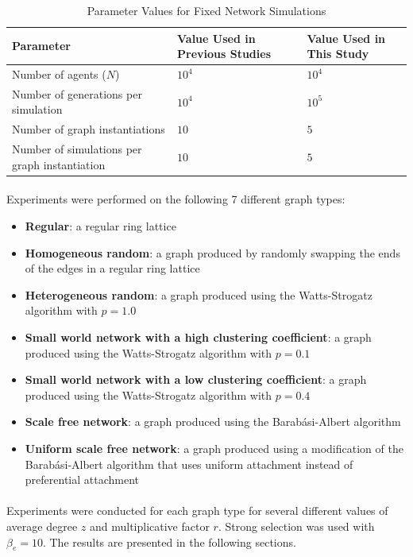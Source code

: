 \documentclass{article}
\begin{document}
	\begin{table}[h!]
		\begin{center}
		\begin{tabu} to \textwidth {X[0.66,l,m]X[0.17,c,m]X[0.17,c,m]}
		\toprule
		Parameter&Value Used in Previous Studies&Value Used in This Study\\
		\midrule
		Number of agents ($N$)&$10^4$&$10^4$\\
		Number of generations per simulation&$10^4$&$10^5$\\
		Number of graph instantiations&$10$&$5$\\
		Number of simulations per graph instantiation&$10$&$5$\\
		\bottomrule
		\end{tabu}
		\caption{Parameter Values for Fixed Network Simulations}
		\label{table:param-values-fixed-net-sim}
		\end{center}
	\end{table}

	\paragraph{}Experiments were performed on the following 7 different graph types:
	\begin{itemize}
		\item \textbf{Regular}: a regular ring lattice
		\item \textbf{Homogeneous random}: a graph produced by randomly swapping the ends of the edges in a regular ring lattice
		\item \textbf{Heterogeneous random}: a graph produced using the Watts-Strogatz algorithm \cite{Watts1998} with $p = 1.0$
		\item \textbf{Small world network with a high clustering coefficient}: a graph produced using the Watts-Strogatz algorithm with $p = 0.1$
		\item \textbf{Small world network with a low clustering coefficient}: a graph produced using the Watts-Strogatz algorithm with $p = 0.4$
		\item \textbf{Scale free network}: a graph produced using the Barab\'{a}si-Albert algorithm \cite{Barabasi1999}
		\item \textbf{Uniform scale free network}: a graph produced using a modification of the Barab\'{a}si-Albert algorithm that uses uniform attachment instead of preferential attachment
	\end{itemize}

	\paragraph{}Experiments were conducted for each graph type for several different values of average degree $z$ and multiplicative factor $r$.  Strong selection was used with $\beta_e=10$.  The results are presented in the following sections.
\end{document}
